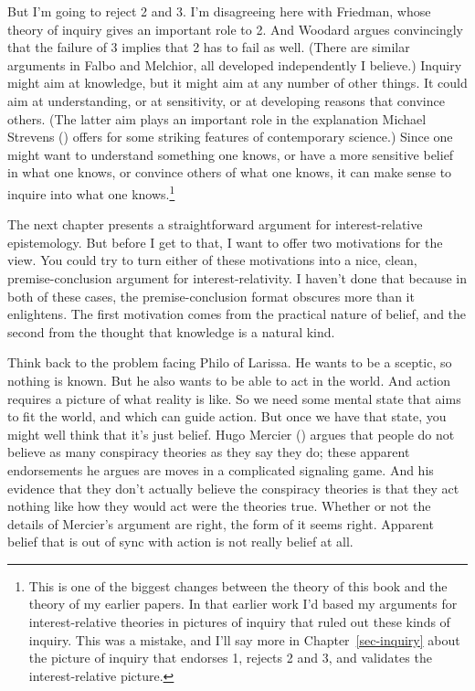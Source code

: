 \documentclass[
  12pt,
  letterpaper,
]{scrbook}
\begin{document}
But I'm going to reject 2 and 3. I'm disagreeing here with Friedman,
whose theory of inquiry gives an important role to 2. And Woodard argues
convincingly that the failure of 3 implies that 2 has to fail as well.
(There are similar arguments in Falbo and Melchior, all developed
independently I believe.) Inquiry might aim at knowledge, but it might
aim at any number of other things. It could aim at understanding, or at
sensitivity, or at developing reasons that convince others. (The latter
aim plays an important role in the explanation Michael Strevens
() offers for some striking features of
contemporary science.) Since one might want to understand something one
knows, or have a more sensitive belief in what one knows, or convince
others of what one knows, it can make sense to inquire into what one
knows.\footnote{This is one of the biggest changes between the theory of
  this book and the theory of my earlier papers. In that earlier work
  I'd based my arguments for interest-relative theories in pictures of
  inquiry that ruled out these kinds of inquiry. This was a mistake, and
  I'll say more in Chapter~\ref{sec-inquiry} about the picture of
  inquiry that endorses 1, rejects 2 and 3, and validates the
  interest-relative picture.}

The next chapter presents a straightforward argument for
interest-relative epistemology. But before I get to that, I want to
offer two motivations for the view. You could try to turn either of
these motivations into a nice, clean, premise-conclusion argument for
interest-relativity. I haven't done that because in both of these cases,
the premise-conclusion format obscures more than it enlightens. The
first motivation comes from the practical nature of belief, and the
second from the thought that knowledge is a natural kind.

Think back to the problem facing Philo of Larissa. He wants to be a
sceptic, so nothing is known. But he also wants to be able to act in the
world. And action requires a picture of what reality is like. So we need
some mental state that aims to fit the world, and which can guide
action. But once we have that state, you might well think that it's just
belief. Hugo Mercier () argues that
people do not believe as many conspiracy theories as they say they do;
these apparent endorsements he argues are moves in a complicated
signaling game. And his evidence that they don't actually believe the
conspiracy theories is that they act nothing like how they would act
were the theories true. Whether or not the details of Mercier's argument
are right, the form of it seems right. Apparent belief that is out of
sync with action is not really belief at all.
\end{document}
